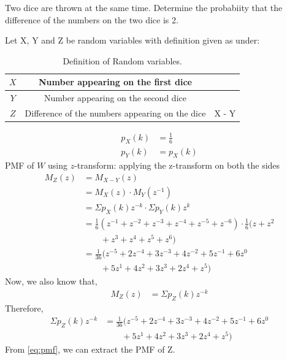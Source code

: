 \documentclass[]{article}
\begin{document}
\providecommand{\qfunc}[1]{\ensuremath{Q\left(#1\right)}}
\providecommand{\gauss}[2]{\mathcal{N}\ensuremath{\left(#1,#2\right)}}
\providecommand{\diff}[2]{\ensuremath{\frac{d{#1}}{d{#2}}}}
\providecommand{\myceil}[1]{\left \lceil #1 \right \rceil }
\newcommand\figref{Fig.~\ref}
\newcommand\tabref{Table~\ref}
\newcommand{\sinc}{\,\text{sinc}\,}
\newcommand{\rect}{\,\text{rect}\,}

\let\vec\mathbf

Two dice are thrown at the same time. Determine the probabiity that the difference
of the numbers on the two dice is 2. 

\solution
Let X, Y and Z be random variables with definition given as under:
\begin{table}[H]
\centering
\begin{tabular}{|c|c|c|}
    \hline
    $X$ & Number appearing on the first dice & \\
    \hline
    $Y$ & Number appearing on the second dice & \\
    \hline
    $Z$ & Difference of the numbers appearing on the dice & X - Y\\
    \hline
\end{tabular}
\label{tab:ncert/10/13/3/1/}
\caption{Definition of Random variables.}
\end{table}

\begin{align}
    p_X(k) &= \frac{1}{6}\\
	p_Y(k) &= p_X(k) 
\end{align}
PMF of $W$ using $z$-transform:
applying the z-transform on both the sides
\begin{align}
	M_Z(z) &= M_{X-Y}(z)\\
	&= M_X(z)\cdot M_Y(z^{-1})\\
  &= \Sigma p_X(k)z^{-k} \cdot \Sigma p_Y(k)z^{k}\\
  &= \frac{1}{6}(z^{-1}+z^{-2}\nonumber+z^{-3}+z^{-4}+z^{-5}+z^{-6}) \cdot \frac{1}{6}(z+z^2 \\&\qquad +z^3+z^4+z^5+z^6) \\
  &= \frac{1}{36}(z^{-5}+2z^{-4}+3z^{-3}+4z^{-2}+5z^{-1}+6z^{0}\nonumber\\&\qquad+5z^{1}+4z^{2}+3z^{3}+2z^{4}+z^{5})
\end{align}
Now, we also know that, 
\begin{align}
	M_Z(z) &= \Sigma p_Z(k)z^{-k}
\end{align}
Therefore, 
\begin{align}
	\Sigma p_Z(k)z^{-k} &= \frac{1}{36}(z^{-5}+2z^{-4}+3z^{-3}+4z^{-2}+5z^{-1}+6z^{0}\nonumber\\&\qquad+5z^{1}+4z^{2}+3z^{3}+2z^{4}+z^{5}) \label{eq:pmf}
\end{align}
From \eqref{eq:pmf}, we can extract the PMF of Z.
\end{document}
